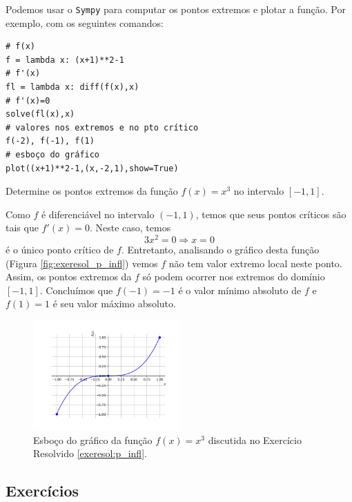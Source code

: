 \begin{resol}
\begin{ifispython}
  Podemos usar o \verb+Sympy+ para computar os pontos extremos e plotar a função. Por exemplo, com os seguintes comandos:
\begin{verbatim}
# f(x)
f = lambda x: (x+1)**2-1
# f'(x)
fl = lambda x: diff(f(x),x)
# f'(x)=0
solve(fl(x),x)
# valores nos extremos e no pto crítico
f(-2), f(-1), f(1)
# esboço do gráfico
plot((x+1)**2-1,(x,-2,1),show=True)
\end{verbatim}
\end{ifispython}
\end{resol}

\begin{exeresol}\label{exeresol:p_infl}
  Determine os pontos extremos da função $f(x)=x^3$ no intervalo $[-1,1]$.
\end{exeresol}
\begin{resol}
  Como $f$ é diferenciável no intervalo $(-1,1)$, temos que seus pontos críticos são tais que $f'(x)=0$. Neste caso, temos
  \begin{equation}
    3x^2=0\Rightarrow x=0
  \end{equation}
  é o único ponto crítico de $f$. Entretanto, analisando o gráfico desta função (Figura \ref{fig:exeresol_p_infl}) vemos $f$ não tem valor extremo local neste ponto. Assim, os pontos extremos da $f$ só podem ocorrer nos extremos do domínio $[-1,1]$. Concluímos que $f(-1)=-1$ é o valor mínimo absoluto de $f$ e $f(1)=1$ é seu valor máximo absoluto.

  \begin{figure}[H]
    \centering
    \includegraphics[width=0.5\textwidth]{./cap_apderiv/dados/fig_exeresol_p_infl/fig_exeresol_p_infl}
    \caption{Esboço do gráfico da função $f(x) = x^3$ discutida no Exercício Resolvido \ref{exeresol:p_infl}.}
    \label{fig:exeresol_f_diff}
  \end{figure}
\end{resol}

\subsection{Exercícios}

